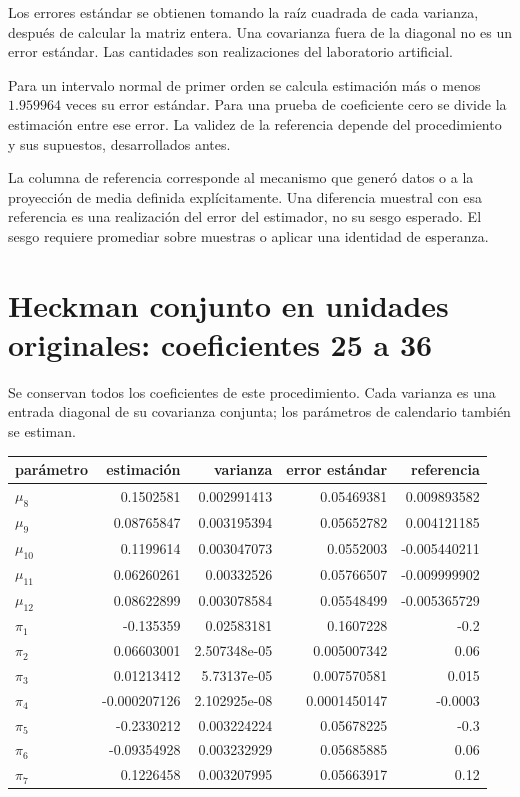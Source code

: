 \documentclass[11pt,a4paper]{article}
\begin{document}
Los errores estándar se obtienen tomando la raíz cuadrada de cada varianza, después de calcular la matriz entera. Una covarianza fuera de la diagonal no es un error estándar. Las cantidades son realizaciones del laboratorio artificial.

Para un intervalo normal de primer orden se calcula estimación más o menos $1.959964$ veces su error estándar. Para una prueba de coeficiente cero se divide la estimación entre ese error. La validez de la referencia depende del procedimiento y sus supuestos, desarrollados antes.

La columna de referencia corresponde al mecanismo que generó datos o a la proyección de media definida explícitamente. Una diferencia muestral con esa referencia es una realización del error del estimador, no su sesgo esperado. El sesgo requiere promediar sobre muestras o aplicar una identidad de esperanza.

\clearpage
\section{Heckman conjunto en unidades originales: coeficientes 25 a 36}
Se conservan todos los coeficientes de este procedimiento. Cada varianza es una entrada diagonal de su covarianza conjunta; los parámetros de calendario también se estiman.
\begin{center}\small
\begin{tabular}{lrrrr}
\toprule
parámetro & estimación & varianza & error estándar & referencia\\\midrule
$\mu_8$ & 0.1502581 & 0.002991413 & 0.05469381 & 0.009893582\\
$\mu_9$ & 0.08765847 & 0.003195394 & 0.05652782 & 0.004121185\\
$\mu_10$ & 0.1199614 & 0.003047073 & 0.0552003 & -0.005440211\\
$\mu_11$ & 0.06260261 & 0.00332526 & 0.05766507 & -0.009999902\\
$\mu_12$ & 0.08622899 & 0.003078584 & 0.05548499 & -0.005365729\\
$\pi_1$ & -0.135359 & 0.02583181 & 0.1607228 & -0.2\\
$\pi_2$ & 0.06603001 & 2.507348e-05 & 0.005007342 & 0.06\\
$\pi_3$ & 0.01213412 & 5.73137e-05 & 0.007570581 & 0.015\\
$\pi_4$ & -0.000207126 & 2.102925e-08 & 0.0001450147 & -0.0003\\
$\pi_5$ & -0.2330212 & 0.003224224 & 0.05678225 & -0.3\\
$\pi_6$ & -0.09354928 & 0.003232929 & 0.05685885 & 0.06\\
$\pi_7$ & 0.1226458 & 0.003207995 & 0.05663917 & 0.12\\
\bottomrule
\end{tabular}\end{center}
\end{document}
